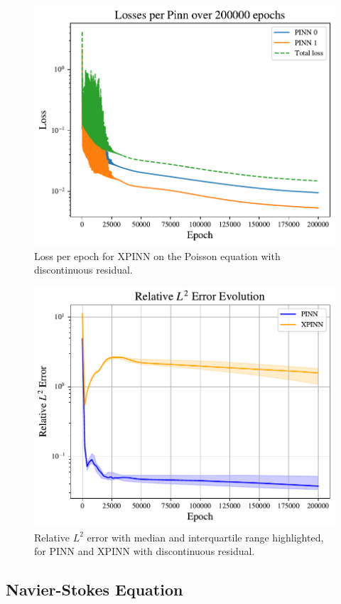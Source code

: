 \begin{figure}[h]
    \centering
    \includegraphics[width=0.9\linewidth]{Project1XPINNs/figures/Poisson/discrete_xpinn_Poisson_losses.pdf}
    \caption{Loss per epoch for XPINN on the Poisson equation with discontinuous residual.}
    \label{fig:xpinn_disc_loss}
\end{figure}
\begin{figure}[h!]
    \centering
    \includegraphics[width = 0.9\linewidth]{Project1XPINNs/figures/Poisson/discrete_l2_error_evolution.pdf}
    \caption{Relative $L^2$ error with median and interquartile range highlighted, for PINN and XPINN with discontinuous residual.}
    \label{fig:rel_l2_discrete_poisson}
\end{figure}

\subsection{Navier-Stokes Equation}
